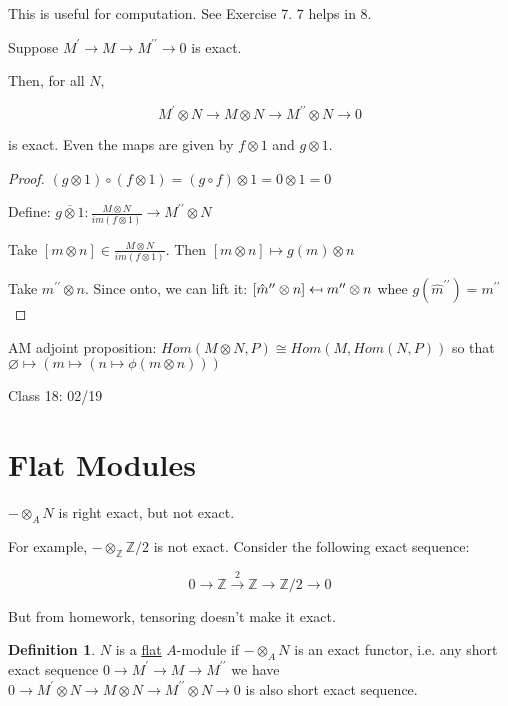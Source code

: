 \documentclass{article}
\theoremstyle{definition}
\newtheorem{definition}{Definition}
\begin{document}
This is useful for computation. See Exercise 7. 7 helps in 8.

Suppose \(M^{\prime} \to M \to M^{\prime\prime} \to 0\) is exact.

Then, for all \(N\),

\[
    M^{\prime} \otimes N \to M \otimes N \to M^{\prime\prime} \otimes N \to 0
\]

is exact. Even the maps are given by \(f \otimes 1\) and \(g \otimes 1\).

\begin{proof}
    \((g \otimes 1) \circ (f \otimes 1) = (g\circ f) \otimes 1 = 0\otimes 1 = 0\) 

    Define: \(\overline{g \otimes 1} : \frac{M \otimes N}{im(f \otimes 1)} \to M^{\prime\prime} \otimes N \)
    
    Take \([m \otimes n]\in \frac{M \otimes N}{im(f \otimes 1)}\). Then \([m \otimes n] \mapsto  g(m) \otimes n\) 

    Take \(m^{\prime\prime} \otimes n\). Since onto, we can lift it: \([\hat{m}^{\prime\prime} \otimes n] \mathrel{\reflectbox{\ensuremath{\mapsto}}} m^{\prime\prime} \otimes n\) whee \(g(\hat{m}^{\prime\prime} )= m^{\prime\prime} \) 
    
\end{proof}

AM adjoint proposition:
\(Hom(M \otimes N,P)\cong Hom(M,Hom(N,P))\) so that \(\varnothing \mapsto (m \mapsto (n \mapsto \phi(m \otimes n)))\)  

\hrulefill

Class 18: 02/19

\section*{Flat Modules}

\(-\otimes _A N\) is right exact, but not exact.

For example, \(-\otimes_\mathbb{Z} \mathbb{Z} / 2\) is not exact. Consider the following exact sequence:

\[
    0 \to \mathbb{Z} \overset{2}{\to} \mathbb{Z} \to \mathbb{Z} / 2 \to 0
\]

But from homework, tensoring doesn't make it exact.

\begin{definition}
    \(N\) is a \underline{flat} \(A\)-module if \(- \otimes_A N\) is an exact functor, i.e. any short exact sequence \(0 \to M^{\prime} \to M \to M^{\prime\prime} \) we have \(0 \to M^{\prime} \otimes N \to M \otimes N \to M^{\prime\prime} \otimes N \to 0\) is also short exact sequence.
\end{definition}
\end{document}
